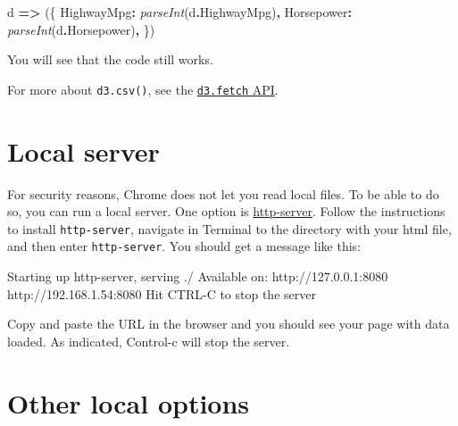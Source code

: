 \documentclass[
  openany]{book}
\newenvironment{Shaded}{\begin{snugshade}}{\end{snugshade}}
\newcommand{\AttributeTok}[1]{\textcolor[rgb]{0.77,0.63,0.00}{#1}}
\newcommand{\DataTypeTok}[1]{\textcolor[rgb]{0.13,0.29,0.53}{#1}}
\newcommand{\ExtensionTok}[1]{#1}
\newcommand{\KeywordTok}[1]{\textcolor[rgb]{0.13,0.29,0.53}{\textbf{#1}}}
\newcommand{\NormalTok}[1]{#1}
\newcommand{\OperatorTok}[1]{\textcolor[rgb]{0.81,0.36,0.00}{\textbf{#1}}}
\newcommand{\PreprocessorTok}[1]{\textcolor[rgb]{0.56,0.35,0.01}{\textit{#1}}}
\begin{document}
\begin{Shaded}
\begin{Highlighting}[]
\NormalTok{d }\KeywordTok{=\textgreater{}}\NormalTok{ (\{}
            \DataTypeTok{HighwayMpg}\OperatorTok{:} \PreprocessorTok{parseInt}\NormalTok{(d}\OperatorTok{.}\AttributeTok{HighwayMpg}\NormalTok{)}\OperatorTok{,}
            \DataTypeTok{Horsepower}\OperatorTok{:} \PreprocessorTok{parseInt}\NormalTok{(d}\OperatorTok{.}\AttributeTok{Horsepower}\NormalTok{)}\OperatorTok{,}
\NormalTok{        \})}
\end{Highlighting}
\end{Shaded}

You will see that the code still works.

For more about \texttt{d3.csv()}, see the \href{https://github.com/d3/d3-fetch/blob/v1.1.2/README.md\#csv}{\texttt{d3.fetch} API}.

\hypertarget{local-server}{%
\section{Local server}\label{local-server}}

For security reasons, Chrome does not let you read local files. To be able to do so, you can run a local server. One option is \href{https://www.npmjs.com/package/http-server}{http-server}. Follow the instructions to install \texttt{http-server}, navigate in Terminal to the directory with your html file, and then enter \texttt{http-server}. You should get a message like this:

\begin{Shaded}
\begin{Highlighting}[]
\ExtensionTok{Starting}\NormalTok{ up http{-}server, serving ./}
\ExtensionTok{Available}\NormalTok{ on:}
  \ExtensionTok{http}\NormalTok{://127.0.0.1:8080}
  \ExtensionTok{http}\NormalTok{://192.168.1.54:8080}
\ExtensionTok{Hit}\NormalTok{ CTRL{-}C to stop the server}
\end{Highlighting}
\end{Shaded}

Copy and paste the URL in the browser and you should see your page with data loaded. As indicated, Control-c will stop the server.

\hypertarget{other-local-options}{%
\section{Other local options}\label{other-local-options}}
\end{document}
